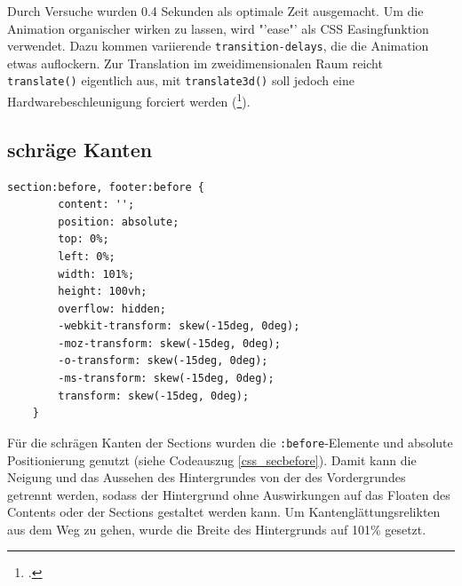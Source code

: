 Durch Versuche wurden 0.4 Sekunden als optimale Zeit ausgemacht. Um die Animation organischer wirken zu lassen, wird "'ease"' als CSS Easingfunktion verwendet. Dazu kommen variierende \lstinline{transition-delays}, die die Animation etwas auflockern.
Zur Translation im zweidimensionalen Raum reicht \lstinline{translate()} eigentlich aus, mit \lstinline{translate3d()} soll jedoch eine Hardwarebeschleunigung forciert werden (\footcite[vgl.][]{css3D}).

\subsection{schräge Kanten}
\begin{lstlisting}[caption=Der Hintergrund der Section als Container., label=css_secbefore]
section:before, footer:before {
        content: '';
        position: absolute;
        top: 0%;
        left: 0%;
        width: 101%;
        height: 100vh;
        overflow: hidden;
        -webkit-transform: skew(-15deg, 0deg);
        -moz-transform: skew(-15deg, 0deg);
        -o-transform: skew(-15deg, 0deg);
        -ms-transform: skew(-15deg, 0deg);
        transform: skew(-15deg, 0deg);
    }
\end{lstlisting}

Für die schrägen Kanten der Sections wurden die \lstinline{:before}-Elemente und absolute Positionierung genutzt (siehe Codeauszug \ref{css_secbefore}). Damit kann die Neigung und das Aussehen des Hintergrundes von der des Vordergrundes getrennt werden, sodass der Hintergrund ohne Auswirkungen auf das Floaten des Contents oder der Sections gestaltet werden kann. Um Kantenglättungsrelikten aus dem Weg zu gehen, wurde die Breite des Hintergrunds auf 101\% gesetzt.
